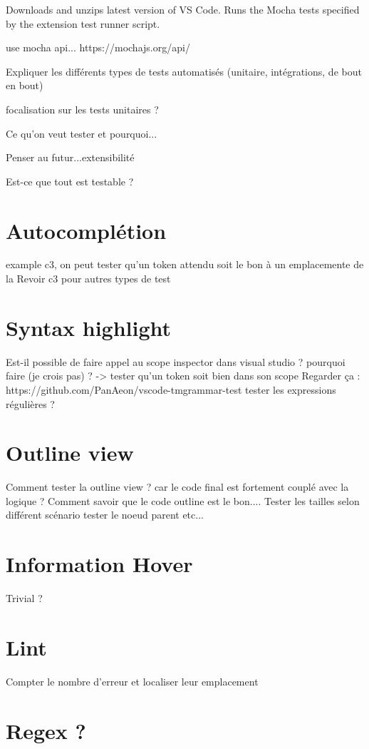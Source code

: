 \documentclass[
    iict, %
    il, %
]{heig-tb}
\begin{document}
Downloads and unzips latest version of VS Code.
Runs the Mocha tests specified by the extension test runner script.

use mocha api...
https://mochajs.org/api/


Expliquer les différents types de tests automatisés (unitaire, intégrations, de bout en bout)

focalisation sur les tests unitaires ?

Ce qu'on veut tester et pourquoi...

Penser au futur...extensibilité

Est-ce que tout est testable ?


\section{Autocomplétion}
example c3, on peut tester qu'un token attendu soit le bon à un emplacemente de la
Revoir c3 pour autres types de test

\section{Syntax highlight}
Est-il possible de faire appel au scope inspector dans visual studio ? pourquoi faire (je crois pas) ? -> tester qu'un token soit bien dans son scope
Regarder ça : https://github.com/PanAeon/vscode-tmgrammar-test
tester les expressions régulières ?


\section{Outline view}
Comment tester la outline view ? car le code final est fortement couplé avec la logique ?
Comment savoir que le code outline est le bon....
Tester les tailles selon différent scénario
tester le noeud parent etc...


\section{Information Hover}
Trivial ?

\section{Lint}
Compter le nombre d'erreur et localiser leur emplacement

\section{Regex ?}
\end{document}
